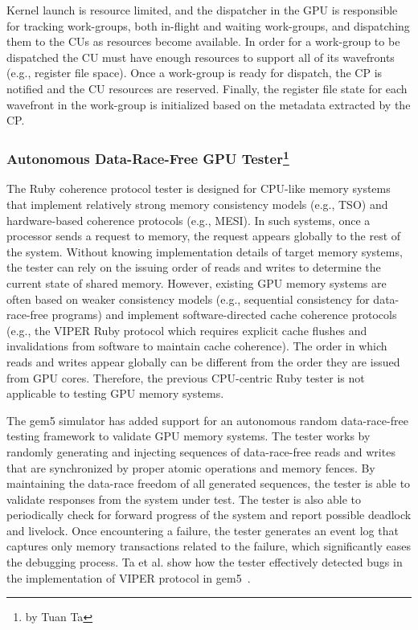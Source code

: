 Kernel launch is resource limited, and the dispatcher
in the GPU is responsible for tracking work-groups, both in-flight and waiting work-groups, and
dispatching them to the CUs as resources become available. In order for a work-group to be dispatched
the CU must have enough resources to support all of its wavefronts (e.g., register file space).
Once a work-group is ready for dispatch, the CP is notified and the CU resources are reserved.
Finally, the register file state for each wavefront in the work-group is initialized based
on the metadata extracted by the CP.

\subsubsection[Autonomous Data-Race-Free GPU Tester]{Autonomous Data-Race-Free GPU Tester\footnote{by Tuan Ta}}

The Ruby coherence protocol tester is designed for CPU-like memory systems that implement relatively strong memory consistency models (e.g., TSO) and hardware-based coherence protocols (e.g., MESI).
In such systems, once a processor sends a request to memory, the request appears globally to the rest of the system.
Without knowing implementation details of target memory systems, the tester can rely on the issuing order of reads and writes to determine the current state of shared memory.
However, existing GPU memory systems are often based on weaker consistency models (e.g., sequential consistency for data-race-free programs) and implement software-directed cache coherence protocols (e.g., the VIPER Ruby protocol which requires explicit cache flushes and invalidations from software to maintain cache coherence).
The order in which reads and writes appear globally can be different from the order they are issued from GPU cores.
Therefore, the previous CPU-centric Ruby tester is not applicable to testing GPU memory systems.

The gem5 simulator has added support for an autonomous random data-race-free testing framework to validate GPU memory systems.
The tester works by randomly generating and injecting sequences of data-race-free reads and writes that are synchronized by proper atomic operations and memory fences.
By maintaining the data-race freedom of all generated sequences, the tester is able to validate responses from the system under test.
The tester is also able to periodically check for forward progress of the system and report possible deadlock and livelock.
Once encountering a failure, the tester generates an event log that captures only memory transactions related to the failure, which significantly eases the debugging process.
Ta et al. show how the tester effectively detected bugs in the implementation of VIPER protocol in gem5~\cite{Ta2019gputesting}.
